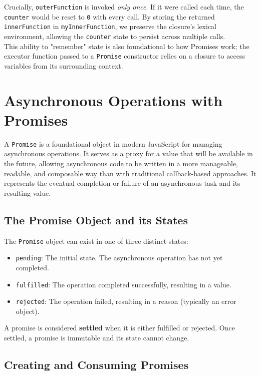 \documentclass{scrbook}
\begin{document}
Crucially, \texttt{outerFunction} is invoked \textit{only once}. If it were called each time, the \texttt{counter} would be reset to \texttt{0} with every call. By storing the returned \texttt{innerFunction} in \texttt{myInnerFunction}, we preserve the closure's lexical environment, allowing the \texttt{counter} state to persist across multiple calls. \\

This ability to "remember" state is also foundational to how Promises work; the executor function passed to a \texttt{Promise} constructor relies on a closure to access variables from its surrounding context.

\chapter{Asynchronous Operations with Promises}

A \texttt{Promise} is a foundational object in modern JavaScript for managing asynchronous operations. It serves as a proxy for a value that will be available in the future, allowing asynchronous code to be written in a more manageable, readable, and composable way than with traditional callback-based approaches. It represents the eventual completion or failure of an asynchronous task and its resulting value.

\section{The Promise Object and its States}

The \texttt{Promise} object can exist in one of three distinct states:

\begin{itemize}
    \item
    \texttt{pending}: The initial state. The asynchronous operation has not yet completed.
    
    \item
    \texttt{fulfilled}: The operation completed successfully, resulting in a value.
    
    \item
    \texttt{rejected}: The operation failed, resulting in a reason (typically an error object).
\end{itemize}

A promise is considered \textbf{settled} when it is either fulfilled or rejected. Once settled, a promise is immutable and its state cannot change.

\section{Creating and Consuming Promises}
\end{document}
